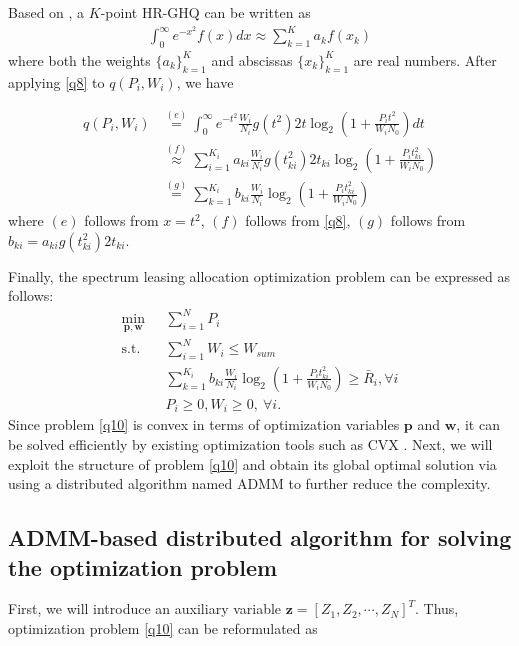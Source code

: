\documentclass[journal]{IEEEtran}
\begin{document}
Based on \cite{NMSteen}, a $K$-point HR-GHQ can be written as
\begin{align} \label{q8}
\int_{0}^{\infty}e^{-x^2} f\left(x\right) dx \approx \sum\limits_{k = 1}^{K} a_k f\left(x_k\right)
\end{align}
where both the weights $\{a_k\}_{k = 1}^K$ and abscissas $\{x_k\}_{k = 1}^K$ are real numbers. After applying \eqref{q8} to $q\left(P_i, W_i\right)$, we have

\begin{align}
q\left(P_i, W_i\right) &\overset{\left(e\right)}{=} \int_{0}^{\infty}e^{-t^2}\frac{W_i}{N_i} g\left(t^2\right) 2t \log_2\left(1 + \frac{P_it^2}{W_iN_0}\right)dt  \nonumber \\
& \overset{\left(f\right)}{\approx} \sum\limits_{i = 1}^{K_i}a_{ki}\frac{W_i}{N_i}g\left(t_{ki}^2\right)2t_{ki}\log_2\left(1 + \frac{P_it_{ki}^2}{W_iN_0}\right) \nonumber \\
& \overset{\left(g\right)}{=} \sum\limits_{k = 1}^{K_i}b_{ki}\frac{W_i}{N_i}\log_2\left(1 + \frac{P_it_{ki}^2}{W_iN_0}\right)
\end{align}
where $\left(e\right)$ follows from $x = t^2$, $\left(f\right)$ follows from \eqref{q8}, $\left(g\right)$ follows from $b_{ki} = a_{ki}g\left(t_{ki}^2\right)2t_{ki}$.

Finally, the spectrum leasing allocation optimization problem can be expressed as follows:
\begin{subequations}\label{q10}
	\begin{align}
	\min_{\mathbf{p}, \mathbf{w}}\ & \sum\limits_{i = 1}^{N} P_i \label{q10a} \\ \mbox{s.t.} \quad &  \sum\limits_{i = 1}^{N} W_i \leq W_{sum} \label{q10b} \\ \quad &  \sum\limits_{k = 1}^{K_i}b_{ki}\frac{W_i}{N_i}\log_2\left(1 + \frac{P_it_{ki}^2}{W_iN_0}\right) \geq \bar{R}_i, \forall i \label{q10c}\\
	& P_i \geq 0, W_i \geq 0, \ \forall i. \label{q10d}
	\end{align}
\end{subequations}
Since problem \eqref{q10} is convex in terms of optimization variables $\mathbf{p}$ and $\mathbf{w}$, it can be solved efficiently by existing optimization tools such as CVX \cite{SBoyd1}. Next, we will exploit the structure of problem \eqref{q10} and obtain its global optimal solution via using a distributed algorithm named ADMM \cite{SBoyd2,EChen} to further reduce the complexity.
\subsection{ADMM-based distributed algorithm for solving the optimization problem}
First, we will introduce an auxiliary variable $\mathbf{z} = \left[Z_1, Z_2, \cdots, Z_N\right]^T$. Thus, optimization problem \eqref{q10} can be reformulated as
\end{document}
